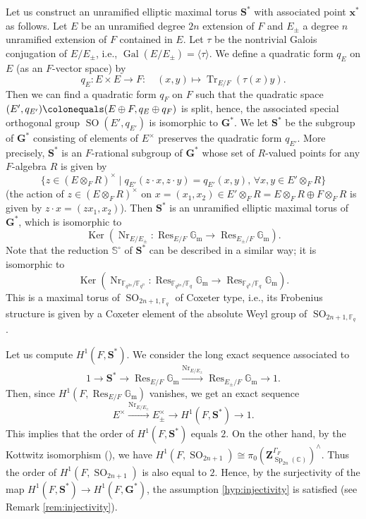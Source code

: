 \documentclass{amsart}
\newcommand{\x}{\mathbf{x}}
\newcommand{\F}{\mathbb{F}}
\newcommand{\C}{\mathbb{C}}
\newcommand{\Gm}{\mathbb{G}_{\mathrm{m}}}
\newcommand{\bbS}{\mathbb{S}}
\newcommand{\bfG}{\mathbf{G}}
\newcommand{\bfS}{\mathbf{S}}
\newcommand{\bfZ}{\mathbf{Z}}
\DeclareMathOperator{\Gal}{Gal}
\DeclareMathOperator{\Ker}{Ker}
\DeclareMathOperator{\Nr}{Nr}
\DeclareMathOperator{\Res}{Res}
\DeclareMathOperator{\Tr}{Tr}
\DeclareMathOperator{\SO}{SO}
\DeclareMathOperator{\Sp}{Sp}
\theoremstyle{plain}
\theoremstyle{definition}
\theoremstyle{remark}
\theoremstyle{theorem}
\begin{document}
Let us construct an unramified elliptic maximal torus $\bfS^{\ast}$ with associated point $\x^{\ast}$ as follows.
Let $E$ be an unramified degree $2n$ extension of $F$ and $E_{\pm}$ a degree $n$ unramified extension of $F$ contained in $E$.
Let $\tau$ be the nontrivial Galois conjugation of $E/E_{\pm}$, i.e., $\Gal(E/E_{\pm})=\langle\tau\rangle$.
We define a quadratic form $q_{E}$ on $E$ (as an $F$-vector space) by
\[
q_{E}\colon E\times E\rightarrow F:\quad
(x,y)
\mapsto
\Tr_{E/F}(\tau(x)y).
\]
Then we can find a quadratic form $q_{F}$ on $F$ such that the quadratic space $(E',q_{E'})\colonequals (E\oplus F, q_{E}\oplus q_{F})$ is split, hence, the associated special orthogonal group $\SO(E', q_{E'})$ is isomorphic to $\bfG^{\ast}$.
We let $\bfS^{\ast}$ be the subgroup of $\bfG^{\ast}$ consisting of elements of $E^{\times}$ preserves the quadratic form $q_{E'}$.
More precisely, $\bfS^{\ast}$ is an $F$-rational subgroup of $\bfG^{\ast}$ whose set of $R$-valued points for any $F$-algebra $R$ is given by
\[
\{z\in (E\otimes_{F} R)^{\times} \mid q_{E'}(z\cdot x,z\cdot y)=q_{E'}(x,y),\, \forall x,y\in E'\otimes_{F}R\}
\]
(the action of $z\in(E\otimes_{F}R)^{\times}$ on $x=(x_{1},x_{2})\in E'\otimes_{F}R=E\otimes_{F}R\oplus F\otimes_{F}R$ is given by $z\cdot x=(zx_{1},x_{2})$).
Then $\bfS^{\ast}$ is an unramified elliptic maximal torus of $\bfG^{\ast}$, which is isomorphic to
\[
\Ker(\Nr_{E/E_{\pm}}\colon \Res_{E/F}\Gm \rightarrow \Res_{E_{\pm}/F}\Gm).
\]
Note that the reduction $\bbS^{\circ}$ of $\bfS^{\ast}$ can be described in a similar way; it is isomorphic to 
\[
\Ker(\Nr_{\F_{q^{2n}}/\F_{q^{n}}}\colon \Res_{\F_{q^{2n}}/\F_{q}}\Gm \rightarrow \Res_{\F_{q^{n}}/\F_{q}}\Gm).
\]
This is a maximal torus of $\SO_{2n+1,\F_{q}}$ of Coxeter type, i.e., its Frobenius structure is given by a Coxeter element of the absolute Weyl group of $\SO_{2n+1,\F_{q}}$.

Let us compute $H^{1}(F,\bfS^{\ast})$.
We consider the long exact sequence associated to
\[
1
\rightarrow
\bfS^{\ast}
\rightarrow
\Res_{E/F}\Gm
\xrightarrow{\Nr_{E/E_{\pm}}}
\Res_{E_{\pm}/F}\Gm
\rightarrow
1.
\]
Then, since $H^{1}(F,\Res_{E/F}\Gm)$ vanishes, we get an exact sequence
\[
E^{\times}
\xrightarrow{\Nr_{E/E_{\pm}}}
E_{\pm}^{\times}
\rightarrow
H^{1}(F,\bfS^{\ast})
\rightarrow
1.
\]
This implies that the order of $H^{1}(F,\bfS^{\ast})$ equals $2$.
On the other hand, by the Kottwitz isomorphism (\cite[1.2 Theorem]{Kot86}), we have $H^{1}(F,\SO_{2n+1})\cong\pi_{0}(\bfZ_{\Sp_{2n}(\C)}^{\Gamma_{F}})^{\wedge}$.
Thus the order of $H^{1}(F,\SO_{2n+1})$ is also equal to $2$.
Hence, by the surjectivity of the map $H^{1}(F,\bfS^{\ast})\rightarrow H^{1}(F,\bfG^{\ast})$, the assumption \eqref{hyp:injectivity} is satisfied (see Remark \ref{rem:injectivity}).
\end{document}
